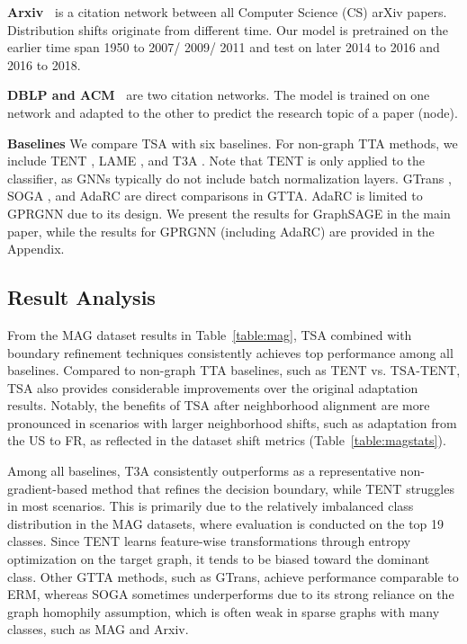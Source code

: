 \textbf{Arxiv~\cite{hu2020open}} is a citation network between all Computer Science (CS) arXiv papers. 
Distribution shifts originate from different time.
Our model is pretrained on the earlier time span 1950 to 2007/ 2009/ 2011 and test on later 2014 to 2016 and 2016 to 2018.


\textbf{DBLP and ACM~\cite{tang2008arnetminer, wu2020unsupervised}} are two citation networks. 
The model is trained on one network and adapted to the other to predict the research topic of a paper (node).

\textbf{Baselines} We compare TSA with six baselines. For non-graph TTA methods, we include TENT \cite{wang2020tent}, LAME \cite{boudiaf2022parameter}, and T3A \cite{iwasawa2021test}. Note that TENT is only applied to the classifier, as GNNs typically do not include batch normalization layers. GTrans \cite{jin2022empowering}, SOGA \cite{mao2024source}, and AdaRC \cite{bao2024adarc} are direct comparisons in GTTA.
AdaRC is limited to GPRGNN due to its design. We present the results for GraphSAGE \cite{hamilton2017inductive} in the main paper, while the results for GPRGNN \cite{chien2020adaptive} (including AdaRC) are provided in the Appendix.

\subsection{Result Analysis}
From the MAG dataset results in Table~\ref{table:mag}, TSA combined with boundary refinement techniques consistently achieves top performance among all baselines. Compared to non-graph TTA baselines, such as TENT vs. TSA-TENT, TSA also provides considerable improvements over the original adaptation results. Notably, the benefits of TSA after neighborhood alignment are more pronounced in scenarios with larger neighborhood shifts, such as adaptation from the US to FR, as reflected in the dataset shift metrics (Table~\ref{table:magstats}). 

Among all baselines, T3A consistently outperforms as a representative non-gradient-based method that refines the decision boundary, while TENT struggles in most scenarios. This is primarily due to the relatively imbalanced class distribution in the MAG datasets, where evaluation is conducted on the top 19 classes. Since TENT learns feature-wise transformations through entropy optimization on the target graph, it tends to be biased toward the dominant class. Other GTTA methods, such as GTrans, achieve performance comparable to ERM, whereas SOGA sometimes underperforms due to its strong reliance on the graph homophily assumption, which is often weak in sparse graphs with many classes, such as MAG and Arxiv.

